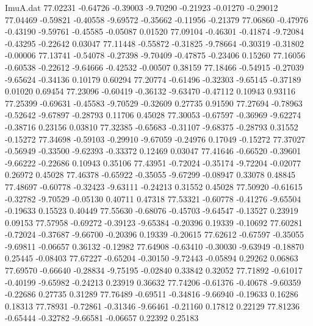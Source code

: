 \begin{filecontents}{ImuA.dat}
  77.02231   -0.64726   -0.39003   -9.70290   -0.21923   -0.01270   -0.29012
  77.04469   -0.59821   -0.40558   -9.69572   -0.35662   -0.11956   -0.21379
  77.06860   -0.47976   -0.43190   -9.59761   -0.45585   -0.05087    0.01520
  77.09104   -0.46301   -0.41874   -9.72084   -0.43295   -0.22642    0.03047
  77.11448   -0.55872   -0.31825   -9.78664   -0.30319   -0.31802   -0.00006
  77.13741   -0.54078   -0.27398   -9.70409   -0.47875   -0.23406    0.15260
  77.16056   -0.60538   -0.22612   -9.64666   -0.42532   -0.00507    0.38159
  77.18466   -0.54915   -0.27039   -9.65624   -0.34136    0.10179    0.60294
  77.20774   -0.61496   -0.32303   -9.65145   -0.37189    0.01020    0.69454
  77.23096   -0.60419   -0.36132   -9.63470   -0.47112    0.10943    0.93116
  77.25399   -0.69631   -0.45583   -9.70529   -0.32609    0.27735    0.91590
  77.27694   -0.78963   -0.52642   -9.67897   -0.28793    0.11706    0.45028
  77.30053   -0.67597   -0.36969   -9.62274   -0.38716    0.23156    0.03810
  77.32385   -0.65683   -0.31107   -9.68375   -0.28793    0.31552   -0.15272
  77.34698   -0.59103   -0.29910   -9.67059   -0.24976    0.17049   -0.15272
  77.37027   -0.56949   -0.33500   -9.62393   -0.33372    0.12469    0.03047
  77.41646   -0.66520   -0.39601   -9.66222   -0.22686    0.10943    0.35106
  77.43951   -0.72024   -0.35174   -9.72204   -0.02077    0.26972    0.45028
  77.46378   -0.65922   -0.35055   -9.67299   -0.08947    0.33078    0.48845
  77.48697   -0.60778   -0.32423   -9.63111   -0.24213    0.31552    0.45028
  77.50920   -0.61615   -0.32782   -9.70529   -0.05130    0.40711    0.47318
  77.53321   -0.60778   -0.41276   -9.65504   -0.19633    0.15523    0.40449
  77.55630   -0.68076   -0.45703   -9.64547   -0.13527    0.23919    0.09153
  77.57958   -0.69272   -0.39123   -9.65384   -0.20396    0.19339   -0.10692
  77.60281   -0.72024   -0.37687   -9.66700   -0.20396    0.19339   -0.20615
  77.62612   -0.67597   -0.35055   -9.69811   -0.06657    0.36132   -0.12982
  77.64908   -0.63410   -0.30030   -9.63949   -0.18870    0.25445   -0.08403
  77.67227   -0.65204   -0.30150   -9.72443   -0.05894    0.29262    0.06863
  77.69570   -0.66640   -0.28834   -9.75195   -0.02840    0.33842    0.32052
  77.71892   -0.61017   -0.40199   -9.65982   -0.24213    0.23919    0.36632
  77.74206   -0.61376   -0.40678   -9.60359   -0.22686    0.27735    0.31289
  77.76489   -0.69511   -0.34816   -9.66940   -0.19633    0.16286    0.18313
  77.78931   -0.72861   -0.31346   -9.66461   -0.21160    0.17812    0.22129
  77.81236   -0.65444   -0.32782   -9.66581   -0.06657    0.22392    0.25183

\end{filecontents}
